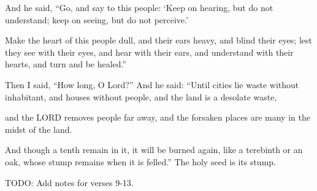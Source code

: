 \documentclass[11pt]{article}
\begin{document}
\begin{biblicaloutline}[Isaiah 6:9-13]
    

    \begin{versesection}{2em}
         And he said, ``Go, and say to this people: `Keep on hearing, but do not understand; keep on seeing, but do not perceive.'

         Make the heart of this people dull, and their ears heavy, and blind their eyes; lest they see with their eyes, and hear with their ears, and understand with their hearts, and turn and be healed.''
    \end{versesection}
    
    
    \begin{versesection}{2em}
         Then I said, ``How long, O Lord?'' And he said: ``Until cities lie waste without inhabitant, and houses without people, and the land is a desolate waste,

         and the LORD removes people far away, and the forsaken places are many in the midst of the land.

         And though a tenth remain in it, it will be burned again, like a terebinth or an oak, whose stump remains when it is felled.'' The holy seed is its stump.
    \end{versesection}

\end{biblicaloutline}

{\vspace{2em}}
TODO: Add notes for verses 9-13.

\begin{thesauce}


\end{thesauce}
\end{document}
